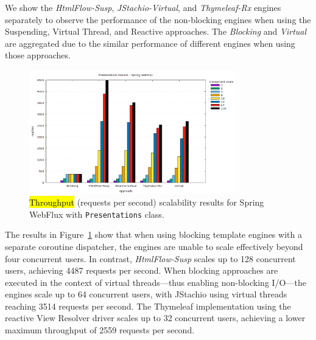 \documentclass[software,article,accept,pdftex,moreauthors]{Definitions/mdpi}
\begin{document}

We show the \textit{HtmlFlow-Susp}, \textit{JStachio-Virtual}, and
\textit{Thymeleaf-Rx} engines separately to observe the performance of the
non-blocking engines when using the Suspending, Virtual Thread, and Reactive
approaches. The \textit{Blocking} and \textit{Virtual} are aggregated due to
the similar performance of different engines when using those approaches.

\begin{figure}[H]
\vspace{-6pt}
     \includegraphics[width=0.8\textwidth]{./Graphs/presentations-webflux-jmeter.png}
     \caption{\hl{Throughput} %
 (requests per second) scalability results for Spring WebFlux with \texttt{Presentations} class.}\label{fig:presentations-webflux-jmeter}
\end{figure}

The results in Figure~\ref{fig:presentations-webflux-jmeter} show that when
using blocking template engines with a separate coroutine dispatcher, the
engines are unable to scale effectively beyond four concurrent users. In contrast,
\textit{HtmlFlow-Susp} scales up to 128 concurrent users, achieving 4487 %
requests per second. When blocking approaches are executed in the context of
virtual threads---thus enabling non-blocking I/O---the engines scale up to 64
concurrent users, with JStachio using virtual threads reaching 3514 requests
per second. The Thymeleaf implementation using the reactive View Resolver
driver scales up to 32 concurrent users, achieving a lower maximum throughput
of 2559 requests per second.
\end{document}
